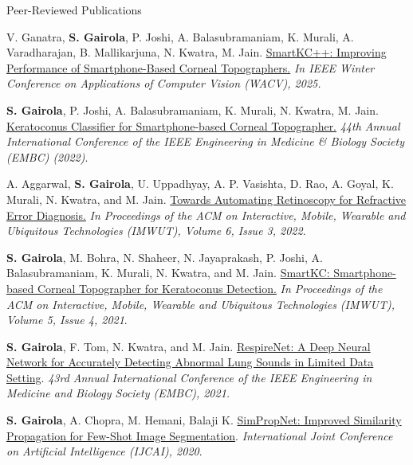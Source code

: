 \documentclass{resume} %
\begin{document}
\begin{rSection}{Peer-Reviewed Publications}
\item[(9.)] V. Ganatra, \textbf{S. Gairola}, P. Joshi, A. Balasubramaniam, K. Murali, A. Varadharajan, B. Mallikarjuna, N. Kwatra, M. Jain. \href{https://openaccess.thecvf.com/content/WACV2025/html/Ganatra_SmartKC_Improving_Performance_of_Smartphone-Based_Corneal_Topographers_WACV_2025_paper.html}{SmartKC++: Improving Performance of Smartphone-Based Corneal Topographers.} \textit{In IEEE Winter Conference on Applications of Computer Vision (WACV), 2025.}

\item[(8.)] \textbf{S. Gairola}, P. Joshi, A. Balasubramaniam, K. Murali, N. Kwatra, M. Jain. \href{https://arxiv.org/abs/2205.03702}{Keratoconus Classifier for Smartphone-based Corneal Topographer.} \textit{44th Annual International Conference of the IEEE Engineering in Medicine \& Biology Society (EMBC) (2022)}.

\item[(7.)] A. Aggarwal, \textbf{S. Gairola}, U. Uppadhyay, A. P. Vasishta, D. Rao, A. Goyal, K. Murali, N. Kwatra, and M. Jain. \href{https://arxiv.org/abs/2208.05552}{Towards Automating Retinoscopy for Refractive Error Diagnosis.} \textit{In Proceedings of the ACM on Interactive, Mobile, Wearable and Ubiquitous Technologies (IMWUT), Volume 6, Issue 3, 2022}.

\item[(6.)] \textbf{S. Gairola}, M. Bohra, N. Shaheer, N. Jayaprakash, P. Joshi, A. Balasubramaniam, K. Murali, N. Kwatra, and M. Jain. \href{https://sidgairo18.github.io/smartkc.pdf}{SmartKC: Smartphone-based Corneal Topographer for Keratoconus Detection.} \textit{In Proceedings of the ACM on Interactive, Mobile, Wearable and Ubiquitous Technologies (IMWUT), Volume 5, Issue 4, 2021}.

\item[(5.)] \textbf{S. Gairola}, F. Tom, N. Kwatra, and M. Jain. \href{https://arxiv.org/pdf/2011.00196.pdf}{RespireNet: A Deep Neural Network for Accurately Detecting Abnormal Lung Sounds in Limited Data Setting}. \textit{43rd Annual International Conference of the IEEE Engineering in Medicine and Biology Society (EMBC), 2021.}

\vspace{4pt}
\item[(4.)] \textbf{S. Gairola}, A. Chopra, M. Hemani, Balaji K. \href{https://www.ijcai.org/Proceedings/2020/0080.pdf}{SimPropNet:  Improved Similarity Propagation for Few-Shot Image Segmentation}. \textit{International Joint Conference on Artificial Intelligence (IJCAI), 2020}.


\end{rSection}
\end{document}
